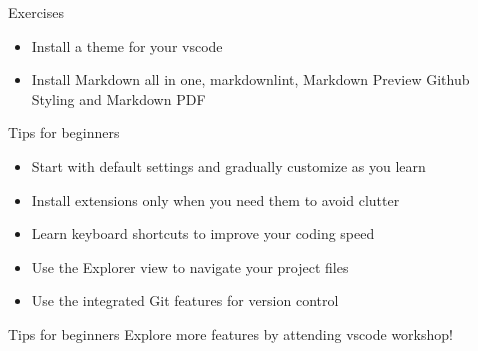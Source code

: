 \begin{frame}[fragile]{Exercises}
	\begin{itemize}
		\item Install a theme for your vscode
		\item Install Markdown all in one, markdownlint, Markdown Preview Github Styling and Markdown PDF
	\end{itemize}
\end{frame}

\begin{frame}[fragile]{Tips for beginners}
	\begin{itemize}
		\item Start with default settings and gradually customize as you learn
		\item Install extensions only when you need them to avoid clutter
		\item Learn keyboard shortcuts to improve your coding speed
		\item Use the Explorer view to navigate your project files
		\item Use the integrated Git features for version control
	\end{itemize}
\end{frame}

\begin{frame}[fragile]{Tips for beginners}
	\huge Explore more features by attending vscode workshop!
\end{frame}
